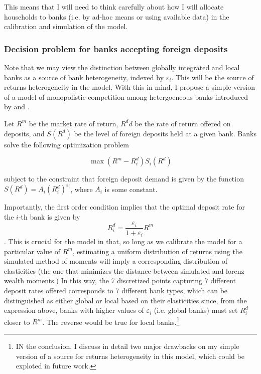 \par This means that I will need to think carefully about how I will allocate households to banks (i.e. by ad-hoc means or using available data) in the calibration and simulation of the model.

\subsubsection{Decision problem for banks accepting foreign deposits}

\par Note that we may view the distinction between globally integrated and local banks as a source of bank heterogeneity, indexed by $\varepsilon_i$. This will be the source of returns heterogeneity in the model. With this in mind, I propose a simple version of a model of monopolistic competition among hetergoeneous banks introduced by \cite{Monti1972} and \cite{Klein1971}.

\par Let $R^m$ be the market rate of return, $R^dd$ be the rate of return offered on deposits, and $S(R^d)$ be the level of foreign deposits held at a given bank. Banks solve the following optimization problem

$$ \max (R^m -R_i^d) S_i(R^d) $$

\par subject to the constraint that foreign deposit demand is given by the function $S(R^d) = A_i (R_i^d)^{\varepsilon_i}$, where $A_i$ is some constant. 

\par Importantly, the first order condition implies that the optimal deposit rate for the $i$-th bank is given by $$ R_i^d = \frac{\varepsilon_i}{1+\varepsilon_i} R^m  $$. This is crucial for the model in that, so long as we calibrate the model for a particular value of $R^m$, estimating a uniform distribution of returns using the simulated method of moments will imply a corresponding distribution of elasticities (the one that minimizes the distance between simulated and lorenz wealth moments.) In this way, the 7 discretized points capturing 7 different deposit rates offered corresponds to 7 different bank types, which can be distinguished as either global or local based on their elasticities since, from the expression above, banks with higher values of $\varepsilon_i$ (i.e. global banks)  must set $R_i^d$ closer to $R^m$. The reverse would be true for local banks.\footnote{IN the conclusion, I discuss in detail two major drawbacks on my simple version of a source for returns heterogeneity in this model, which could be exploted in future work.}

